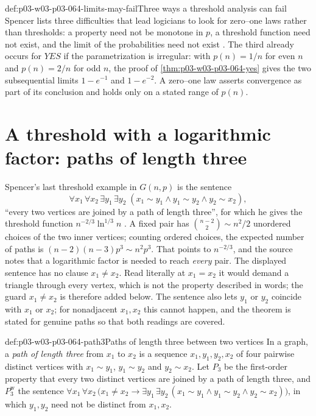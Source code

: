 \begin{hbwarning}{def:p03-w03-p03-064-limits-may-fail}{Three ways a threshold analysis can fail}
Spencer lists three difficulties that lead logicians to look for zero--one
laws rather than thresholds: a property need not be monotone in \(p\), a
threshold function need not exist, and the limit of the probabilities need
not exist \cite[pp.~2--3]{Spencer2007LogicRandomStructuresAuthor}.  The third
already occurs for \(\mathit{YES}\) if the parametrization is irregular: with
\(p(n)=1/n\) for even \(n\) and \(p(n)=2/n\) for odd \(n\), the proof of
\cref{thm:p03-w03-p03-064-yes} gives the two subsequential limits
\(1-e^{-1}\) and \(1-e^{-2}\).  A zero--one law asserts convergence as part of
its conclusion and holds only on a stated range of \(p(n)\).
\end{hbwarning}

\section{A threshold with a logarithmic factor: paths of length three}
\label{sec:p03-w03-p03-064-paths}

Spencer's last threshold example in \(G(n,p)\) is the sentence
\[
  \forall x_1\,\forall x_2\,\exists y_1\,\exists y_2\;
  (x_1\sim y_1\wedge y_1\sim y_2\wedge y_2\sim x_2),
\]
``every two vertices are joined by a path of length three'', for which he
gives the threshold function \(n^{-2/3}\ln^{1/3}n\)
\cite[p.~5]{Spencer2007LogicRandomStructuresAuthor}.  A fixed pair has
\(\binom{n-2}{2}\sim n^2/2\) unordered choices of the two inner vertices;
counting ordered choices, the expected number of paths is
\((n-2)(n-3)p^3\sim n^2p^3\).  That points to \(n^{-2/3}\), and the source
notes that a logarithmic factor is needed to reach \emph{every} pair.  The
displayed sentence has no clause \(x_1\neq x_2\).  Read literally at
\(x_1=x_2\) it would demand a triangle through every vertex, which is not the
property described in words; the guard \(x_1\neq x_2\) is therefore added
below.  The sentence also lets \(y_1\) or \(y_2\) coincide with \(x_1\) or
\(x_2\); for nonadjacent \(x_1,x_2\) this cannot happen, and the theorem is
stated for genuine paths so that both readings are covered.

\begin{hbdefinition}{def:p03-w03-p03-064-path3}{Paths of length three between two vertices}
In a graph, a \emph{path of length three} from \(x_1\) to \(x_2\) is a
sequence \(x_1,y_1,y_2,x_2\) of four pairwise distinct vertices with
\(x_1\sim y_1\), \(y_1\sim y_2\) and \(y_2\sim x_2\).  Let \(P_3\) be the
first-order property that every two distinct vertices are joined by a path
of length three, and \(P_3^{\mathrm w}\) the sentence
\(\forall x_1\,\forall x_2\,\bigl(x_1\neq x_2\rightarrow\exists y_1\,\exists y_2\,
(x_1\sim y_1\wedge y_1\sim y_2\wedge y_2\sim x_2)\bigr)\), in which
\(y_1,y_2\) need not be distinct from \(x_1,x_2\).
\end{hbdefinition}

